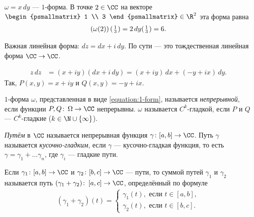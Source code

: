 \begin{exmpl*}
 $\omega = x \, dy$ --- $1$-форма. В точке $2 \in \CC$ на векторе $ \begin{psmallmatrix}
  1 \\ 3
 \end{psmallmatrix} \in \R^{2}$ эта форма равна
 \begin{align*}
  \left(\omega (2)\right) \begin{psmallmatrix}
   1 \\ 3
  \end{psmallmatrix}= 2 \, dy \begin{psmallmatrix}
   1 \\ 3
  \end{psmallmatrix} = 6
 .\end{align*} 
\end{exmpl*}
\begin{exmpl*}
 Важная линейная форма: $dz = dx + i\,dy$. По сути --- это тождественная линейная форма $\CC \to \CC$.
\end{exmpl*}
\begin{exmpl*}
 \begin{align*}
  z\,dz &= (x + iy)(dx + i\,dy) = (x + iy)\,dx + (-y +ix)\,dy
 .\end{align*} Так, $P(x,y) = x + iy$ и $Q(x,y) = -y + ix$.
\end{exmpl*}
\begin{df*}
 $1$-форма $\omega$, представленная в виде \eqref{equation:1-form}, называется \textit{непрерывной}, если функции $P,Q \colon\, \Omega \to \CC$ непрерывны. $\omega$ называется $C^{k}$-гладкой, если $P$ и $Q$ --- $C^{k}$-гладкие ($k \in \N \cup \left\{ \infty \right\}$).
\end{df*}
\begin{df*}
 \textit{Путём} в $\CC$ называется непрерывная функция $\gamma \colon [a,b] \to \CC$. Путь $\gamma$ называется \textit{кусочно-гладким}, если $\gamma$ --- кусочно-гладкая функция, то есть $\gamma = \gamma_1 + \ldots \gamma_n$, где $\gamma_i$ --- гладкие пути.
\end{df*}

\begin{df*}
 Если $\gamma_1 \colon [a,b] \to \CC$ и $\gamma_2 \colon [b,c] \to \CC$ --- пути, то суммой путей $\gamma_1$ и $\gamma_2$ называется путь $(\gamma_1 + \gamma_2)\colon\, [a,c] \to \CC$, определённый по формуле
 \begin{align*}
  (\gamma_1 + \gamma_2)(t) = \begin{cases}
   \gamma_1(t), \text{ если } t \in [a,b],  \\
   \gamma_2(t), \text{ если } t \in [b,c].
  \end{cases} 
 \end{align*} 
\end{df*}

